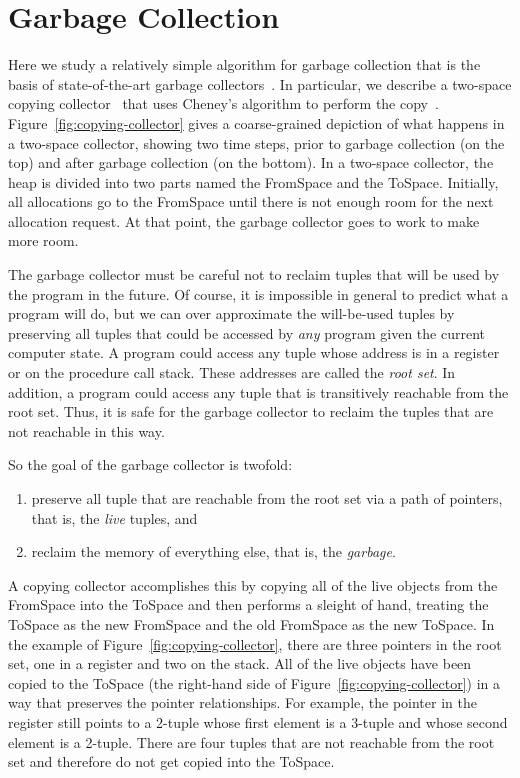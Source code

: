 \documentclass[11pt]{book}
\begin{document}
\section{Garbage Collection}
\label{sec:GC}

Here we study a relatively simple algorithm for garbage collection
that is the basis of state-of-the-art garbage
collectors~\citep{Lieberman:1983aa,Ungar:1984aa,Jones:1996aa,Detlefs:2004aa,Dybvig:2006aa,Tene:2011kx}. In
particular, we describe a two-space copying
collector~\citep{Wilson:1992fk} that uses Cheney's algorithm to
perform the
copy~\citep{Cheney:1970aa}.
Figure~\ref{fig:copying-collector} gives a
coarse-grained depiction of what happens in a two-space collector,
showing two time steps, prior to garbage collection (on the top) and
after garbage collection (on the bottom). In a two-space collector,
the heap is divided into two parts named the FromSpace and the
ToSpace. Initially, all allocations go to the FromSpace until there is
not enough room for the next allocation request. At that point, the
garbage collector goes to work to make more room.

The garbage collector must be careful not to reclaim tuples that will
be used by the program in the future. Of course, it is impossible in
general to predict what a program will do, but we can over approximate
the will-be-used tuples by preserving all tuples that could be
accessed by \emph{any} program given the current computer state.  A
program could access any tuple whose address is in a register or on
the procedure call stack. These addresses are called the \emph{root
  set}. In addition, a program could access any tuple that is
transitively reachable from the root set. Thus, it is safe for the
garbage collector to reclaim the tuples that are not reachable in this
way.

So the goal of the garbage collector is twofold:
\begin{enumerate}
\item preserve all tuple that are reachable from the root set via a
  path of pointers, that is, the \emph{live} tuples, and
\item reclaim the memory of everything else, that is, the
  \emph{garbage}.
\end{enumerate}
A copying collector accomplishes this by copying all of the live
objects from the FromSpace into the ToSpace and then performs a sleight
of hand, treating the ToSpace as the new FromSpace and the old
FromSpace as the new ToSpace.  In the example of
Figure~\ref{fig:copying-collector}, there are three pointers in the
root set, one in a register and two on the stack.  All of the live
objects have been copied to the ToSpace (the right-hand side of
Figure~\ref{fig:copying-collector}) in a way that preserves the
pointer relationships. For example, the pointer in the register still
points to a 2-tuple whose first element is a 3-tuple and whose second
element is a 2-tuple.  There are four tuples that are not reachable
from the root set and therefore do not get copied into the ToSpace.
\end{document}
